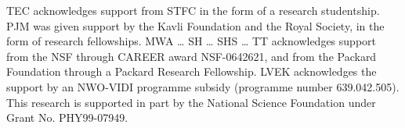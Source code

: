 TEC acknowledges support from STFC in the form of a research studentship.
%
PJM was given support by the Kavli Foundation and the Royal 
Society, in the form of research fellowships.
%
MWA \ldots
%
SH \ldots
%
SHS \ldots
%
TT acknowledges support from the NSF through CAREER award NSF-0642621,
and from the Packard Foundation through a Packard Research Fellowship.
% 
LVEK acknowledges the support by an NWO-VIDI programme subsidy
(programme number 639.042.505).
%
This research is supported in part by the National Science Foundation under
Grant No. PHY99-07949.

